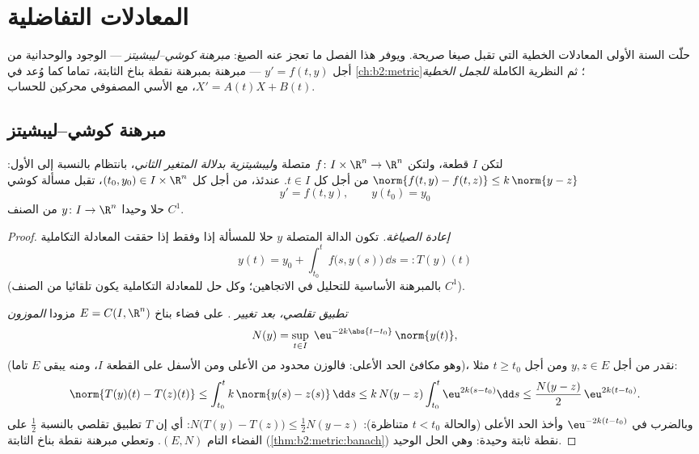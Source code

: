 \chapter{المعادلات التفاضلية}\label{ch:b2:diffeq}

حلّت السنة الأولى المعادلات الخطية التي تقبل صيغا صريحة. ويوفر هذا
الفصل ما تعجز عنه الصيغ: \emph{مبرهنة كوشي--ليبشيتز} --- الوجود
والوحدانية من أجل $y' = f(t, y)$ --- مبرهنة بمبرهنة نقطة بناخ الثابتة، تماما
كما وُعد في \cref{ch:b2:metric}؛ ثم النظرية الكاملة \emph{للجمل الخطية} $X' = A(t)X + B(t)$، مع
الأسي المصفوفي  محركين للحساب.

\section{مبرهنة كوشي--ليبشيتز}

\begin{theorem}\label{thm:b2:diffeq:cauchylipschitz}
لتكن $I$ قطعة، ولتكن $f \colon I \times \R^n \to \R^n$ متصلة و\emph{ليبشيتزية بدلالة المتغير
الثاني}، بانتظام بالنسبة إلى الأول: $\norm{f(t, y) - f(t, z)} \leq k\,\norm{y - z}$ من أجل كل $t
\in I$. عندئذ، من
أجل كل $(t_0, y_0) \in I \times \R^n$، تقبل مسألة كوشي
\[
y' = f(t, y), \qquad y(t_0) = y_0
\]
حلا وحيدا $y \colon I \to \R^n$ من الصنف $C^1$.
\end{theorem}

\begin{proof}
\emph{إعادة الصياغة.} تكون الدالة المتصلة $y$ حلا للمسألة إذا
وفقط إذا حققت المعادلة التكاملية
\[
y(t) = y_0 + \int_{t_0}^{t} f\bigl(s, y(s)\bigr)\,\dd s
=: T(y)(t)
\]
(بالمبرهنة الأساسية للتحليل في الاتجاهين؛ وكل حل  للمعادلة
التكاملية يكون تلقائيا من الصنف $C^1$).

\emph{تطبيق تقلصي، بعد تغيير .} على فضاء بناخ $E =
C(I, \R^n)$ مزودا
\emph{ الموزون}
\[
N(y) = \sup_{t \in I}\; \eu^{-2k\abs{t - t_0}}\,\norm{y(t)} ,
\]
(وهو مكافئ  الحد الأعلى: فالوزن محدود من الأعلى ومن الأسفل على
القطعة $I$، ومنه يبقى $E$ تاما)، نقدر من أجل $y, z \in
E$ ومن أجل
$t \geq t_0$ مثلا:
\[
\norm{T(y)(t) - T(z)(t)}
\leq \int_{t_0}^{t} k\,\norm{y(s) - z(s)}\,\dd s
\leq k\,N(y - z)\int_{t_0}^{t} \eu^{2k(s - t_0)}\dd s
\leq \frac{N(y-z)}{2}\,\eu^{2k(t - t_0)} .
\]
وبالضرب في $\eu^{-2k(t - t_0)}$ وأخذ الحد الأعلى (والحالة $t
< t_0$ متناظرة): $N\bigl(T(y) - T(z)\bigr) \leq \frac12 N(y -
z)$:
أي إن $T$ تطبيق تقلصي بالنسبة $\frac12$ على الفضاء التام $(E, N)$. وتعطي
مبرهنة نقطة بناخ الثابتة (\cref{thm:b2:metric:banach}) نقطة ثابتة وحيدة: وهي الحل الوحيد.
\end{proof}

